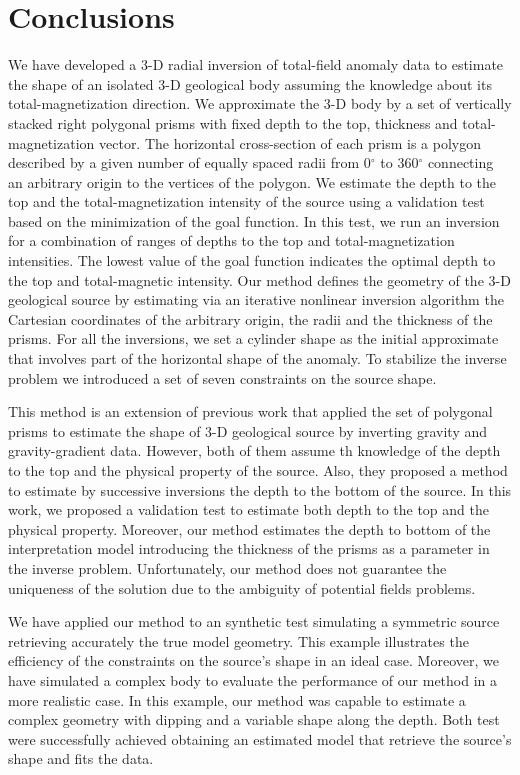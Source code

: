 \section{Conclusions}

We have developed a 3-D radial inversion of total-field anomaly data to estimate the shape of an isolated 3-D geological body assuming the knowledge about its total-magnetization direction. We approximate the 3-D body by a set of vertically stacked right polygonal prisms with fixed depth to the top, thickness and total-magnetization vector. The horizontal cross-section of each prism is a polygon described by a given number of equally spaced radii from 0$^\circ$ to 360$^\circ$ connecting an arbitrary origin to the vertices of the polygon. We estimate the depth to the top and the total-magnetization intensity of the source using a validation test based on the minimization of the goal function. In this test, we run an inversion for a combination of ranges of depths to the top and total-magnetization intensities. The lowest value of the goal function indicates the optimal depth to the top and total-magnetic intensity. Our method defines the geometry of the 3-D geological source by estimating via an iterative nonlinear inversion algorithm the Cartesian coordinates of the arbitrary origin, the radii and the thickness of the prisms. For all the inversions, we set a cylinder shape as the initial approximate that involves part of the horizontal shape of the anomaly. To stabilize the inverse problem we introduced a set of seven constraints on the source shape.

This method is an extension of previous work that applied the set of polygonal prisms to estimate the shape of 3-D geological source by inverting gravity and gravity-gradient data. However, both of them assume th knowledge of the depth to the top and the physical property of the source. Also, they proposed a method to estimate by successive inversions the depth to the bottom of the source. In this work, we proposed a validation test to estimate both depth to the top and the physical property. Moreover, our method estimates the depth to bottom of the interpretation model introducing the thickness of the prisms as a parameter in the inverse problem. Unfortunately, our method does not guarantee the uniqueness of the solution due to the ambiguity of potential fields problems.

We have applied our method to an synthetic test simulating a symmetric source retrieving accurately the true model geometry. This example illustrates the efficiency of the constraints on the source's shape in an ideal case. Moreover, we have simulated a complex body to evaluate the performance of our method in a more realistic case. In this example, our method was capable to estimate a complex geometry with dipping and a variable shape along the depth. Both test were successfully achieved obtaining an estimated model that retrieve the source's shape and fits the data.


